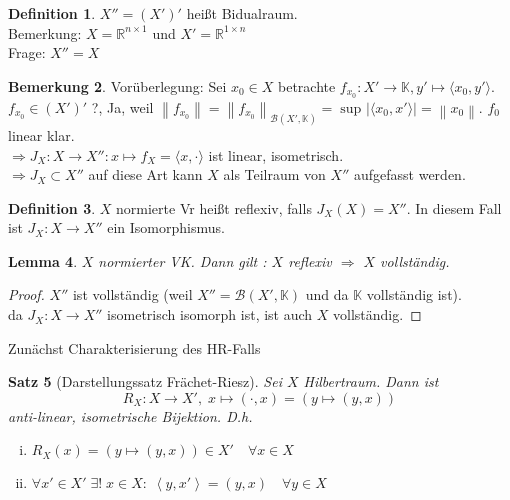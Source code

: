 \documentclass[ngerman]{report}
\theoremstyle{plain}%
\newtheorem{thm}{Satz}[chapter]
\newtheorem{lemma}[thm]{Lemma}
\theoremstyle{definition}%
\newtheorem{definition}[thm]{Definition}
\theoremstyle{myStyle}
\newtheorem{bem}[thm]{Bemerkung}
\newcommand{\R}{\mathbb{R}}
\newcommand{\K}{\mathbb{K}}
\newcommand{\B}{\mathcal{B}} %
\newcommand{\norm}[1]{\left \|#1\right\| }
\newcommand{\df}[1][]{%
	\overset{#1}{\Rightarrow}
}
\newcommand{\Sp}[1]{\left (#1 \right)} %
\newcommand{\fop}[1]{\left \langle #1 \right \rangle} %
\begin{document}
\normalsize

		\begin{definition}
			$X'' = (X')' $ heißt Bidualraum. \\
			Bemerkung: $X = \R^{n\times 1}$ und $X' = \R^{1 \times n}$ \\
			Frage: $X'' = X$	
		\end{definition}

		\begin{bem}
		Vorüberlegung: Sei $x_0 \in X$ betrachte $f_{x_0}: X' \to \K, y' \mapsto \langle x_0, y' \rangle$. 
		$f_{x_0} \in (X')'$ ?, Ja, weil $\norm{f_{x_0}} = \norm{f_{x_0}}_{\B(X',\K)} = \sup_{}|\langle  x_0, x' \rangle| = \norm{x_0}$. $f_0$ linear klar. \\
		$\df {J}_{X}: X \to X'': x \mapsto f_X = \langle x, \cdot \rangle$ ist linear, isometrisch. \\ 
		$\df {J}_X \subset X''$ auf diese Art kann $X$ als Teilraum von $X''$ aufgefasst werden.
		\end{bem}

	\begin{definition}
		$X$ normierte Vr heißt reflexiv, falls ${J}_X(X) = X''$. In diesem Fall ist $J_X :X \to X''$ ein Isomorphismus.
	\end{definition}

	\begin{lemma}
		$X$ normierter VK. Dann gilt : $X$ reflexiv $\df$ $X$ vollständig.
	\end{lemma}

	\begin{proof}
		$X''$ ist vollständig (weil $X''=\B(X',\K)$ und da $\K$ vollständig ist). \\
		da $J_X: X \to X''$ isometrisch isomorph ist, ist auch $X$ vollständig. 
	\end{proof}

	Zunächst Charakterisierung des HR-Falls

	\begin{thm}[Darstellungssatz Frächet-Riesz]
		Sei $X$ Hilbertraum. Dann ist 
			$$R_X : X \to X', \; x \mapsto \Sp{\cdot, x} = (y \mapsto \Sp{y,x})$$
			anti-linear, isometrische Bijektion. D.h.
						\begin{enumerate}[(i)]
							\item $R_X(x) = (y \mapsto \Sp{y,x}) \in X' \quad \forall x\in X$
							\item $\forall x' \in X' \;\exists ! \; x \in X : \; \fop{y,x'} = \Sp{y,x} \quad \forall y \in X$
						\end{enumerate}
	\end{thm}
\end{document}
